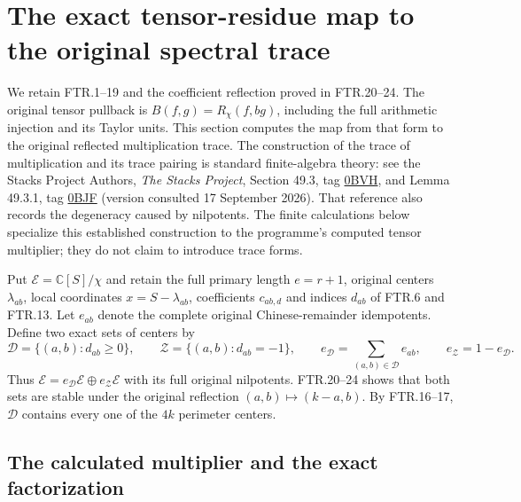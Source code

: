\section{The exact tensor-residue map to the original spectral trace}
\label{sec:frt}

We retain FTR.1--19 and the coefficient reflection proved in FTR.20--24.
The original tensor pullback is $B(f,g)=R_\chi(f,bg)$, including the
full arithmetic injection and its Taylor units. This section computes
the map from that form to the original reflected multiplication trace.
The construction of the trace of multiplication and its trace pairing
is standard finite-algebra theory: see the Stacks Project Authors,
\emph{The Stacks Project}, Section 49.3, tag
\href{https://stacks.math.columbia.edu/tag/0BVH}{0BVH}, and
Lemma 49.3.1, tag
\href{https://stacks.math.columbia.edu/tag/0BJF}{0BJF}
(version consulted 17 September 2026). That reference also records
the degeneracy caused by nilpotents. The finite calculations below
specialize this established construction to the programme's computed
tensor multiplier; they do not claim to introduce trace forms.

Put $\mathcal E=\mathbb C[S]/\chi$ and retain the full primary
length $e=r+1$, original centers $\lambda_{ab}$, local coordinates
$x=S-\lambda_{ab}$, coefficients $c_{ab,d}$ and indices $d_{ab}$
of FTR.6 and FTR.13. Let $e_{ab}$ denote the complete original
Chinese-remainder idempotents. Define two exact sets of centers by
\[
 \mathcal D=\{(a,b):d_{ab}\geq0\},\qquad
 \mathcal Z=\{(a,b):d_{ab}=-1\},\qquad
 e_{\mathcal D}=\sum_{(a,b)\in\mathcal D}e_{ab},\qquad
 e_{\mathcal Z}=1-e_{\mathcal D}.
 \tag{FRT.1}
\]
Thus $\mathcal E=e_{\mathcal D}\mathcal E\oplus
e_{\mathcal Z}\mathcal E$ with its full original nilpotents.
FTR.20--24 shows that both sets are stable under the original
reflection $(a,b)\mapsto(k-a,b)$. By FTR.16--17,
$\mathcal D$ contains every one of the $4k$ perimeter centers.

\subsection{The calculated multiplier and the exact factorization}

